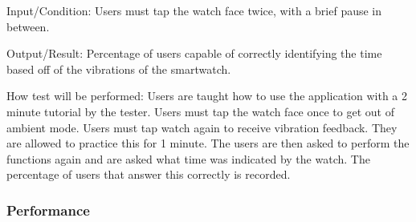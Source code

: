 \begin{enumerate}
Input/Condition: Users must tap the watch face twice, with a brief pause in between.
					
Output/Result: Percentage of users capable of correctly identifying the time based off of the vibrations of the smartwatch. 
					
How test will be performed: Users are taught how to use the application with a 2 minute tutorial by the tester. Users must tap the watch face once to get out of ambient mode. Users must tap watch again to receive vibration feedback. They are allowed to practice this for 1 minute. The users are then asked to perform the functions again and are asked what time was indicated by the watch. The percentage of users that answer this correctly is recorded. 


\end{enumerate}

\subsubsection{Performance}

